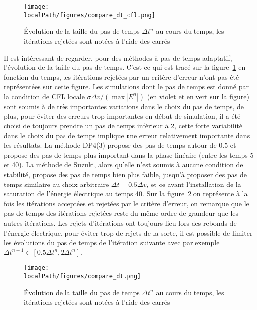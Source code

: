 \begin{figure}[h]
  \centering
  \texttt{[image: \\localPath/figures/compare\_dt\_cfl.png]}
  \caption{Évolution de la taille du pas de temps $\Delta t^n$ au cours du temps, les itérations rejetées sont notées à l'aide des carrés}
  \label{fig:compare:dt:all}
\end{figure}

Il est intéressant de regarder, pour des méthodes à pas de temps adaptatif, l'évolution de la taille du pas de temps. C'est ce qui est tracé sur la figure~\ref{fig:compare:dt:all} en fonction du temps, les itérations rejetées par un critère d'erreur n'ont pas été représentées sur cette figure. Les simulations dont le pas de temps est donné par la condition de CFL locale $\sigma \Delta v/(\max |E^n|)$ (en violet et en vert sur la figure) sont soumis à de très importantes variations dans le choix du pas de temps, de plus, pour éviter des erreurs trop importantes en début de simulation, il a été choisi de toujours prendre un pas de temps inférieur à 2, cette forte variabilité dans le choix du pas de temps implique une erreur relativement importante dans les résultats. La méthode DP4(3) propose des pas de temps autour de $0.5$ et propose des pas de temps plus important dans la phase linéaire (entre les temps 5 et 40). La méthode de Suzuki, alors qu'elle n'est soumis à aucune condition de stabilité, propose des pas de temps bien plus faible, jusqu'à proposer des pas de temps similaire au choix arbitraire $\Delta t = 0.5\Delta v$, et ce avant l'installation de la saturation de l'énergie électrique au temps 40. Sur la figure~\ref{fig:compare:dt} on représente à la fois les itérations acceptées et rejetées par le critère d'erreur, on remarque que le pas de temps des itérations rejetées reste du même ordre de grandeur que les autres itérations. Les rejets d'itérations ont toujours lieu lors des rebonds de l'énergie électrique, pour éviter trop de rejets de la sorte, il est possible de limiter les évolutions du pas de temps de l'itération suivante avec par exemple $\Delta t^{n+1} \in [0.5\Delta t^n,2\Delta t^n]$. 


\begin{figure}[h]
  \centering
  \texttt{[image: \\localPath/figures/compare\_dt.png]}
  \caption{Évolution de la taille du pas de temps $\Delta t^n$ au cours du temps, les itérations rejetées sont notées à l'aide des carrés}
  \label{fig:compare:dt}
\end{figure}

